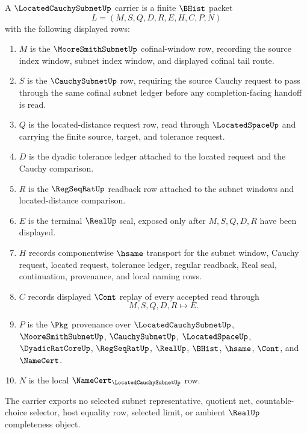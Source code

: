 \begin{definition}
\label{def:located-cauchy-subnet-carrier}
A $\LocatedCauchySubnetUp$ carrier is a finite $\BHist$ packet
$$
L=(M,S,Q,D,R,E,H,C,P,N)
$$
with the following displayed rows:
\begin{enumerate}
\item $M$ is the $\MooreSmithSubnetUp$ cofinal-window row, recording the source index window, subnet index window, and displayed cofinal tail route.
\item $S$ is the $\CauchySubnetUp$ row, requiring the source Cauchy request to pass through the same cofinal subnet ledger before any completion-facing handoff is read.
\item $Q$ is the located-distance request row, read through $\LocatedSpaceUp$ and carrying the finite source, target, and tolerance request.
\item $D$ is the dyadic tolerance ledger attached to the located request and the Cauchy comparison.
\item $R$ is the $\RegSeqRatUp$ readback row attached to the subnet windows and located-distance comparison.
\item $E$ is the terminal $\RealUp$ seal, exposed only after $M,S,Q,D,R$ have been displayed.
\item $H$ records componentwise $\hsame$ transport for the subnet window, Cauchy request, located request, tolerance ledger, regular readback, Real seal, continuation, provenance, and local naming rows.
\item $C$ records displayed $\Cont$ replay of every accepted read through
$$
M,S,Q,D,R \longmapsto E .
$$
\item $P$ is the $\Pkg$ provenance over $\LocatedCauchySubnetUp$, $\MooreSmithSubnetUp$, $\CauchySubnetUp$, $\LocatedSpaceUp$, $\DyadicRatCoreUp$, $\RegSeqRatUp$, $\RealUp$, $\BHist$, $\hsame$, $\Cont$, and $\NameCert$.
\item $N$ is the local $\NameCert_{\LocatedCauchySubnetUp}$ row.
\end{enumerate}
The carrier exports no selected subnet representative, quotient net, countable-choice selector, host equality row, selected limit, or ambient $\RealUp$ completeness object.
\end{definition}

